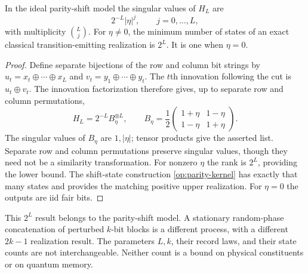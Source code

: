 \begin{theorem}
\label{op:parity-rank}
In the ideal parity-shift model the singular values of \(H_L\) are
\[
 2^{-L}|\eta|^j,\qquad j=0,\ldots,L,
\]
with multiplicity \(\binom Lj\).
For \(\eta\ne0\), the minimum number of states of an exact classical
transition-emitting realization is \(2^L\).  It is one when \(\eta=0\).
\end{theorem}
\begin{proof}
Define separate bijections of the row and column bit strings by
\(u_t=x_t\oplus\cdots\oplus x_L\) and
\(v_t=y_1\oplus\cdots\oplus y_t\).
The \(t\)th innovation following the cut is \(u_t\oplus v_t\).
The innovation factorization therefore gives, up to separate row and
column permutations,
\[
 H_L=2^{-L}B_\eta^{\otimes L},\qquad
 B_\eta=\frac12\begin{pmatrix}1+\eta&1-\eta\\1-\eta&1+\eta\end{pmatrix}.
\]
The singular values of \(B_\eta\) are \(1,|\eta|\); tensor products give
the asserted list.  Separate row and column permutations preserve
singular values, though they need not be a similarity transformation.
For nonzero \(\eta\) the rank is \(2^L\), providing the lower bound.
The shift-state construction \eqref{op:parity-kernel} has exactly that
many states and provides the matching positive upper realization.
For \(\eta=0\) the outputs are iid fair bits.
\end{proof}

This \(2^L\) result belongs to the parity-shift model.  A stationary
random-phase concatenation of perturbed \(k\)-bit blocks is a different
process, with a different \(2k-1\) realization result.  The parameters
\(L,k\), their record laws, and their state counts are not interchangeable.
Neither count is a bound on physical constituents or on quantum memory.


